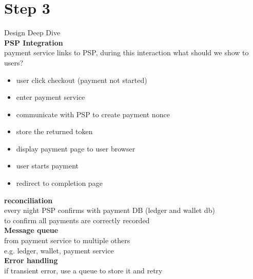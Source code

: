 \documentclass{article}
\begin{document}
\section{Step 3}
Design Deep Dive\\
\textbf{PSP Integration}\\
payment service links to  PSP, during this interaction what should we show to users?\\
\begin{itemize}
    \item user click checkout (payment not started)
    \item enter payment service
    \item communicate with PSP to create payment nonce
    \item store the returned token
    \item display payment page to user browser
    \item user starts payment
    \item redirect to completion page
\end{itemize}
\textbf{reconciliation}\\
every night PSP confirms with payment DB (ledger and wallet db)\\
to confirm all payments are correctly recorded\\
\textbf{Message queue}\\
from payment service to multiple others\\
e.g. ledger, wallet, payment service\\
\textbf{Error handling}\\
if transient error, use a queue to store it and retry
\end{document}
